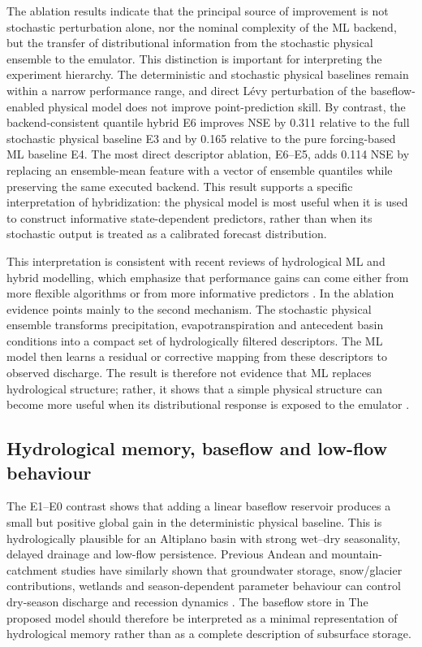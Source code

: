 \documentclass[a4paper,fleqn]{cas-sc}
\begin{document}
The ablation results indicate that the principal source of improvement
is not stochastic perturbation alone, nor the nominal complexity of the
ML backend, but the transfer of distributional information from the
stochastic physical ensemble to the emulator. This distinction is
important for interpreting the experiment hierarchy. The deterministic
and stochastic physical baselines remain within a narrow performance
range, and direct L\'{e}vy perturbation of the baseflow-enabled physical
model does not improve point-prediction skill. By contrast, the
backend-consistent quantile hybrid E6 improves NSE by 0.311 relative to
the full stochastic physical baseline E3 and by 0.165 relative to the
pure forcing-based ML baseline E4. The most direct descriptor ablation,
E6--E5, adds 0.114 NSE by replacing an ensemble-mean feature with a
vector of ensemble quantiles while preserving the same executed
backend. This result supports a specific interpretation of hybridization:
the physical model is most useful when it is used to construct
informative state-dependent predictors, rather than when its stochastic
output is treated as a calibrated forecast distribution.

This interpretation is consistent with recent reviews of hydrological
ML and hybrid modelling, which emphasize that performance gains can
come either from more flexible algorithms or from more informative
predictors \citep{papacharalampous2022review,zhong2023developing}. In
the ablation evidence points mainly to the second mechanism.
The stochastic physical ensemble transforms precipitation,
evapotranspiration and antecedent basin conditions into a compact set of
hydrologically filtered descriptors. The ML model then learns a residual
or corrective mapping from these descriptors to observed discharge. The
result is therefore not evidence that ML replaces hydrological
structure; rather, it shows that a simple physical structure can become
more useful when its distributional response is exposed to the emulator
\citep{mekonnen2015hybrid,houenafa2025hybridization}.

\subsection{Hydrological memory, baseflow and low-flow behaviour}
\label{subsec:discussion-baseflow}

The E1--E0 contrast shows that adding a linear baseflow reservoir
produces a small but positive global gain in the deterministic physical
baseline. This is hydrologically plausible for an Altiplano basin with
strong wet--dry seasonality, delayed drainage and low-flow persistence.
Previous Andean and mountain-catchment studies have similarly shown
that groundwater storage, snow/glacier contributions, wetlands and
season-dependent parameter behaviour can control dry-season discharge
and recession dynamics \citep{nauditt2017conceptual,ragettli2014evaluation,condom2004transient,lima2025modeling}. The baseflow store in
The proposed model should therefore be interpreted as a minimal representation
of hydrological memory rather than as a complete description of
subsurface storage.
\end{document}
